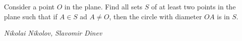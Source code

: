 Consider a point $O$ in the plane. Find all sets $S$ of at least two points in the plane such that if $A\in S$ ad $A\neq O$, then the circle with diameter $OA$ is in $S$.

\textit{Nikolai Nikolov, Slavomir Dinev}